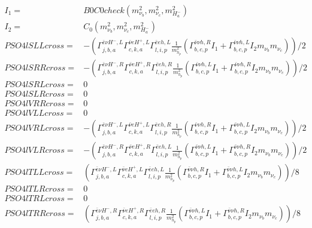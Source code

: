 \documentclass[A4,landscape]{article}
\begin{document}
\begin{align} 
I_1= & B0C0check(m^2_{\nu_{{b}}}, m^2_{\nu_{{c}}}, m^2_{H^-_{{a}}}) \\ 
I_2= & C_0(m^2_{\nu_{{b}}}, m^2_{\nu_{{c}}}, m^2_{H^-_{{a}}}) \\ 
  PSO4lSLLcross= & -( \Gamma^{\bar{e}\nu H^- ,L}_{j, b, a} \Gamma^{\bar{\nu}e H^+,L}_{c, k, a} \Gamma^{\bar{e}e h ,L}_{l, i, p} \frac{1}{m^2_{h_{{p}}}} (\Gamma^{\bar{\nu}\nu h ,R}_{b, c, p} I_1 + \Gamma^{\bar{\nu}\nu h ,L}_{b, c, p} I_2 m_{\nu_{{b}}} m_{\nu_{{c}}}))/2 \\ 
  PSO4lSRRcross= & -( \Gamma^{\bar{e}\nu H^- ,R}_{j, b, a} \Gamma^{\bar{\nu}e H^+,R}_{c, k, a} \Gamma^{\bar{e}e h ,R}_{l, i, p} \frac{1}{m^2_{h_{{p}}}} (\Gamma^{\bar{\nu}\nu h ,L}_{b, c, p} I_1 + \Gamma^{\bar{\nu}\nu h ,R}_{b, c, p} I_2 m_{\nu_{{b}}} m_{\nu_{{c}}}))/2 \\ 
  PSO4lSRLcross= & 0 \\ 
  PSO4lSLRcross= & 0 \\ 
  PSO4lVRRcross= & 0 \\ 
  PSO4lVLLcross= & 0 \\ 
  PSO4lVRLcross= & -( \Gamma^{\bar{e}\nu H^- ,L}_{j, b, a} \Gamma^{\bar{\nu}e H^+,L}_{c, k, a} \Gamma^{\bar{e}e h ,R}_{l, i, p} \frac{1}{m^2_{h_{{p}}}} (\Gamma^{\bar{\nu}\nu h ,R}_{b, c, p} I_1 + \Gamma^{\bar{\nu}\nu h ,L}_{b, c, p} I_2 m_{\nu_{{b}}} m_{\nu_{{c}}}))/2 \\ 
  PSO4lVLRcross= & -( \Gamma^{\bar{e}\nu H^- ,R}_{j, b, a} \Gamma^{\bar{\nu}e H^+,R}_{c, k, a} \Gamma^{\bar{e}e h ,L}_{l, i, p} \frac{1}{m^2_{h_{{p}}}} (\Gamma^{\bar{\nu}\nu h ,L}_{b, c, p} I_1 + \Gamma^{\bar{\nu}\nu h ,R}_{b, c, p} I_2 m_{\nu_{{b}}} m_{\nu_{{c}}}))/2 \\ 
  PSO4lTLLcross= & ( \Gamma^{\bar{e}\nu H^- ,L}_{j, b, a} \Gamma^{\bar{\nu}e H^+,L}_{c, k, a} \Gamma^{\bar{e}e h ,L}_{l, i, p} \frac{1}{m^2_{h_{{p}}}} (\Gamma^{\bar{\nu}\nu h ,R}_{b, c, p} I_1 + \Gamma^{\bar{\nu}\nu h ,L}_{b, c, p} I_2 m_{\nu_{{b}}} m_{\nu_{{c}}}))/8 \\ 
  PSO4lTLRcross= & 0 \\ 
  PSO4lTRLcross= & 0 \\ 
  PSO4lTRRcross= & ( \Gamma^{\bar{e}\nu H^- ,R}_{j, b, a} \Gamma^{\bar{\nu}e H^+,R}_{c, k, a} \Gamma^{\bar{e}e h ,R}_{l, i, p} \frac{1}{m^2_{h_{{p}}}} (\Gamma^{\bar{\nu}\nu h ,L}_{b, c, p} I_1 + \Gamma^{\bar{\nu}\nu h ,R}_{b, c, p} I_2 m_{\nu_{{b}}} m_{\nu_{{c}}}))/8 \\ 
\end{align} 
\end{document}

